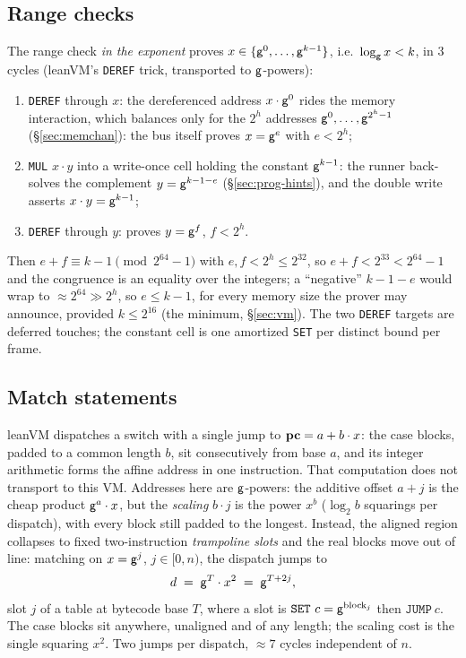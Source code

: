 \subsection{Range checks}\label{sec:prog-range-checks}

The range check \emph{in the exponent} proves $x\in\{\mathsf{g}^{0},\dots,\mathsf{g}^{k-1}\}$, i.e.\ $\log_{\mathsf{g}}x<k$, in 3 cycles (leanVM's \texttt{DEREF} trick, transported to $\mathsf{g}$-powers):
\begin{enumerate}
\item \texttt{DEREF} through $x$: the dereferenced address $x\cdot\mathsf{g}^{0}$ rides the memory interaction, which balances only for the $2^{h}$ addresses $\mathsf{g}^{0},\dots,\mathsf{g}^{2^{h}-1}$ (\S\ref{sec:memchan}): the bus itself proves $x=\mathsf{g}^{e}$ with $e<2^{h}$;
\item \texttt{MUL} $x\cdot y$ into a write-once cell holding the constant $\mathsf{g}^{k-1}$: the runner back-solves the complement $y=\mathsf{g}^{k-1-e}$ (\S\ref{sec:prog-hints}), and the double write asserts $x\cdot y=\mathsf{g}^{k-1}$;
\item \texttt{DEREF} through $y$: proves $y=\mathsf{g}^{f}$, $f<2^{h}$.
\end{enumerate}
Then $e+f\equiv k-1\pmod{2^{64}-1}$ with $e,f<2^{h}\le2^{32}$, so $e+f<2^{33}<2^{64}-1$ and the congruence is an equality over the integers; a ``negative'' $k-1-e$ would wrap to $\approx2^{64}\gg2^{h}$, so $e\le k-1$, for every memory size the prover may announce, provided $k\le2^{16}$ (the minimum, \S\ref{sec:vm}). The two \texttt{DEREF} targets are deferred touches; the constant cell is one amortized \texttt{SET} per distinct bound per frame.

\subsection{Match statements}\label{sec:prog-match}

leanVM dispatches a switch with a single jump to $\mathbf{pc}=a+b\cdot x$: the case blocks, padded to a common length $b$, sit consecutively from base $a$, and its integer arithmetic forms the affine address in one instruction. That computation does not transport to this VM. Addresses here are $\mathsf{g}$-powers: the additive offset $a+j$ is the cheap product $\mathsf{g}^{a}\cdot x$, but the \emph{scaling} $b\cdot j$ is the power $x^{b}$ ($\log_2 b$ squarings per dispatch), with every block still padded to the longest. Instead, the aligned region collapses to fixed two-instruction \emph{trampoline slots} and the real blocks move out of line: matching on $x=\mathsf{g}^{j}$, $j\in[0,n)$, the dispatch jumps to
\[
  d \;=\; \mathsf{g}^{T}\cdot x^{2} \;=\; \mathsf{g}^{T+2j},
\]
slot $j$ of a table at bytecode base $T$, where a slot is $\texttt{SET}\ c=\gen^{\mathrm{block}_j}$ then $\texttt{JUMP}\ c$. The case blocks sit anywhere, unaligned and of any length; the scaling cost is the single squaring $x^{2}$. Two jumps per dispatch, $\approx7$ cycles independent of $n$.

